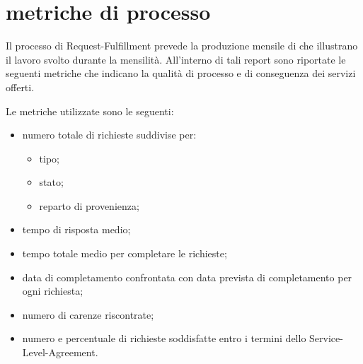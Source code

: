 %
%
\section[Metriche di processo]{metriche di processo}
\label{rf-metrics}
Il processo di \ac{Request-Fulfillment} prevede la produzione mensile di  che illustrano il lavoro svolto durante la mensilità. All'interno di tali report sono riportate le seguenti metriche che indicano la qualità di processo e di conseguenza dei servizi offerti.

Le metriche utilizzate sono le seguenti:

\begin{itemize}
\item{numero totale di richieste suddivise per:}
\begin{itemize}
\item{tipo;}
\item{stato;}
\item{reparto di provenienza;}
\end{itemize}
\item{tempo di risposta medio;}
\item{tempo totale medio per completare le richieste;}
\item{data di completamento confrontata con data prevista di completamento per ogni richiesta;}
\item{numero di carenze riscontrate;}
\item{numero e percentuale di richieste soddisfatte entro i termini dello \ac{Service-Level-Agreement}.}
\end{itemize}